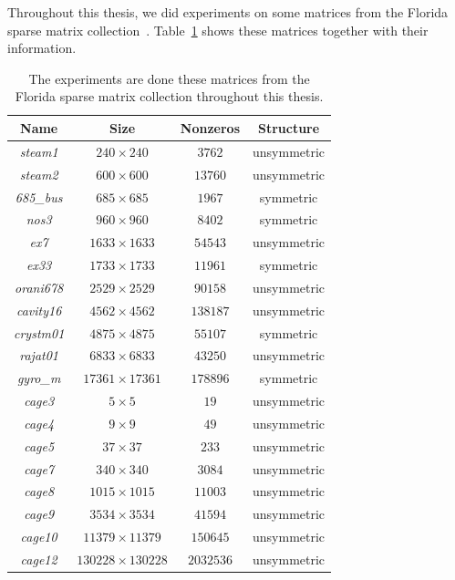 \documentclass[11pt, twoside,a4paper]{book}
\begin{document}
Throughout this thesis, we did experiments on some matrices from the Florida sparse
matrix collection~\cite{florida.matrices}. Table~\ref{florida.mats} shows these matrices
together with their information.

\begin{table}
\centering
\begin{tabular}{|c|c|c|c|}
\hline
Name & Size & Nonzeros & Structure\\\hline
\textit{steam1} & $240\times 240$ & $3762$ & unsymmetric \\\hline
\textit{steam2} & $600\times 600$ & $13760$ & unsymmetric \\\hline
\textit{685\_bus} & $685\times 685$ & $1967$ & symmetric \\\hline
\textit{nos3} & $960\times 960$ & $8402$ & symmetric \\\hline
\textit{ex7} & $1633\times 1633$ & $54543$ & unsymmetric \\\hline
\textit{ex33} & $1733\times 1733$ & $11961$ & symmetric\\\hline
\textit{orani678} & $2529\times 2529$ & $90158$ & unsymmetric \\\hline
\textit{cavity16} & $4562\times 4562$ & $138187$ & unsymmetric \\\hline
\textit{crystm01} &$4875\times 4875$ & $55107$& symmetric\\\hline
\textit{rajat01} & $6833\times 6833$ & $43250$ & unsymmetric\\\hline
\textit{gyro\_m} & $17361\times 17361$ & $178896$ & symmetric\\\hline
\textit{cage3} & $5\times 5$ & $19$ & unsymmetric\\\hline
\textit{cage4} & $9\times 9$ & $49$ & unsymmetric\\\hline
\textit{cage5} & $37\times 37$ & $233$ & unsymmetric\\\hline
\textit{cage7} & $340\times 340$  & $3084$ & unsymmetric\\\hline
\textit{cage8} & $1015\times 1015$  & $11003$ & unsymmetric\\\hline
\textit{cage9} & $3534\times 3534$  & $41594$ & unsymmetric\\\hline
\textit{cage10} & $11379\times 11379$ & $150645$& unsymmetric\\\hline
\textit{cage12} & $130228\times 130228$ &  $2032536$ & unsymmetric\\\hline
\end{tabular}
\caption{The experiments are done these matrices
from the Florida sparse matrix collection throughout this thesis.}
\label{florida.mats}
\end{table}
\end{document}
